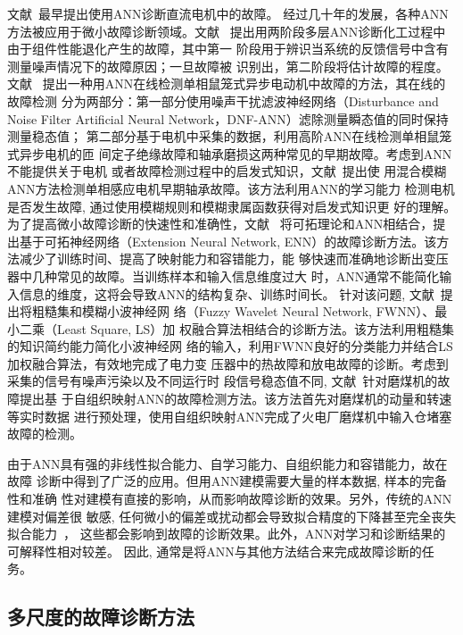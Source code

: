 文献~最早提出使用ANN诊断直流电机中的故障。
经过几十年的发展，各种ANN方法被应用于微小故障诊断领域。文献~
提出用两阶段多层ANN诊断化工过程中由于组件性能退化产生的故障，其中第一
阶段用于辨识当系统的反馈信号中含有测量噪声情况下的故障原因；一旦故障被
识别出，第二阶段将估计故障的程度。文献~
提出一种用ANN在线检测单相鼠笼式异步电动机中故障的方法，其在线的故障检测
分为两部分：第一部分使用噪声干扰滤波神经网络（Disturbance and Noise Filter
Artificial Neural Network，DNF-ANN）滤除测量瞬态值的同时保持测量稳态值；
第二部分基于电机中采集的数据，利用高阶ANN在线检测单相鼠笼式异步电机的匝
间定子绝缘故障和轴承磨损这两种常见的早期故障。考虑到ANN不能提供关于电机
或者故障检测过程中的启发式知识，文献~提出使
用混合模糊ANN方法检测单相感应电机早期轴承故障。该方法利用ANN的学习能力
检测电机是否发生故障, 通过使用模糊规则和模糊隶属函数获得对启发式知识更
好的理解。为了提高微小故障诊断的快速性和准确性，文献~
将可拓理论和ANN相结合，提出基于可拓神经网络（Extension Neural Network,
ENN）的故障诊断方法。该方法减少了训练时间、提高了映射能力和容错能力，能
够快速而准确地诊断出变压器中几种常见的故障。当训练样本和输入信息维度过大
时，ANN通常不能简化输入信息的维度，这将会导致ANN的结构复杂、训练时间长。
针对该问题, 文献~提出将粗糙集和模糊小波神经网
络（Fuzzy Wavelet Neural Network, FWNN）、最小二乘（Least Square, LS）加
权融合算法相结合的诊断方法。该方法利用粗糙集的知识简约能力简化小波神经网
络的输入，利用FWNN良好的分类能力并结合LS加权融合算法，有效地完成了电力变
压器中的热故障和放电故障的诊断。考虑到采集的信号有噪声污染以及不同运行时
段信号稳态值不同, 文献~针对磨煤机的故障提出基
于自组织映射ANN的故障检测方法。该方法首先对磨煤机的动量和转速等实时数据
进行预处理，使用自组织映射ANN完成了火电厂磨煤机中输入仓堵塞故障的检测。

由于ANN具有强的非线性拟合能力、自学习能力、自组织能力和容错能力，故在故障
诊断中得到了广泛的应用。但用ANN建模需要大量的样本数据, 样本的完备性和准确
性对建模有直接的影响，从而影响故障诊断的效果。另外，传统的ANN建模对偏差很
敏感, 任何微小的偏差或扰动都会导致拟合精度的下降甚至完全丧失拟合能力~\cite{zhangzhengdao2004ann}，
这些都会影响到故障的诊断效果。此外，ANN对学习和诊断结果的可解释性相对较差。
因此, 通常是将ANN与其他方法结合来完成故障诊断的任务。

\subsection{多尺度的故障诊断方法}

